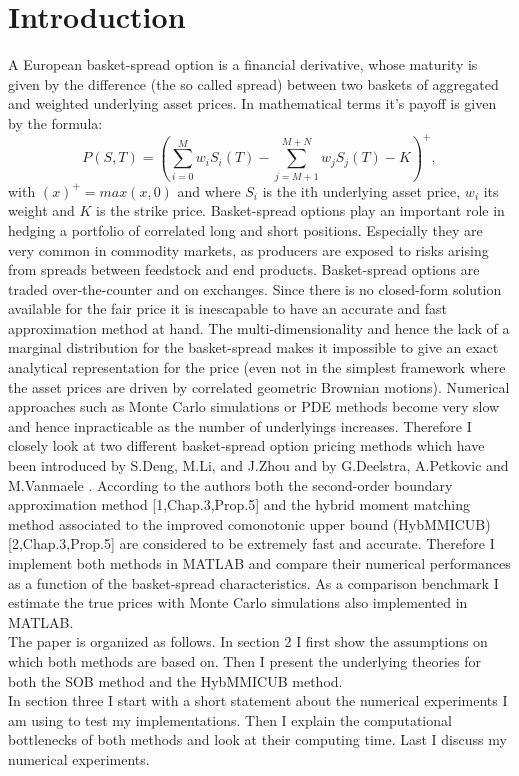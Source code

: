 \documentclass[a4paper]{article}
\begin{document}
\section{Introduction}
A European basket-spread option is a financial derivative, whose
maturity is given by the difference (the so called spread) between two 
baskets of aggregated and weighted underlying asset prices. In mathematical terms it's payoff is given by 
the formula:
\begin{equation}
\label{eq:po}
P(S,T) = (\sum_{i=0}^M w_iS_i(T) - \sum_{j=M+1}^{M+N} w_jS_j(T) - K)^+,
\end{equation}
with $(x)^+=max(x,0)$ and where $S_i$ is the ith underlying asset price, $w_i$ its weight and $K$ is the strike price.
Basket-spread options play an important role in hedging a portfolio of correlated long and short
positions. Especially they are very common in commodity markets,
as producers are exposed to risks arising from spreads between feedstock and end products.
Basket-spread options are traded over-the-counter and on exchanges. Since there is no
closed-form solution available for the fair price it is inescapable to have an accurate and
fast approximation method at hand. The multi-dimensionality and
hence the lack of a marginal distribution for the basket-spread makes it impossible to give an exact
analytical representation for the price (even not in the simplest framework
where the asset prices are driven by  correlated geometric Brownian motions). Numerical approaches such 
as Monte Carlo simulations or PDE methods become very slow and hence inpracticable as the number of underlyings increases. 
Therefore I closely look at two different basket-spread option pricing methods which have been 
introduced by S.Deng, M.Li, and J.Zhou \cite{sob} and by G.Deelstra, A.Petkovic and M.Vanmaele \cite{hybmmicub}. According to the authors both the second-order
boundary approximation method [1,Chap.3,Prop.5] and the hybrid moment matching method associated to the improved comonotonic upper bound (HybMMICUB)
[2,Chap.3,Prop.5] are considered to be extremely fast and accurate. Therefore I implement both methods in MATLAB
and compare their numerical performances as a function of the basket-spread characteristics. 
As a comparison benchmark I estimate the true prices with Monte Carlo simulations also implemented in MATLAB.\\
The paper is organized as follows. In section 2 I first show the assumptions on which both methods are based on. Then I present the underlying theories for both the  SOB method and the HybMMICUB method.\\
In section three I start with a short statement about the numerical experiments I am using to test my implementations. Then I explain the computational bottlenecks of both methods and look at their computing time. Last I discuss my numerical experiments.
\end{document}
